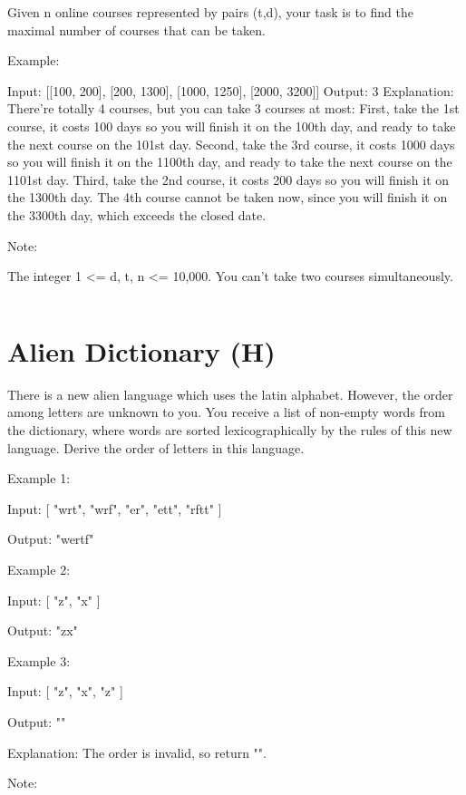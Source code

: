 Given n online courses represented by pairs (t,d), your task is to find the maximal number of courses that can be taken.

Example:

Input: [[100, 200], [200, 1300], [1000, 1250], [2000, 3200]]
Output: 3
Explanation: 
There're totally 4 courses, but you can take 3 courses at most:
First, take the 1st course, it costs 100 days so you will finish it on the 100th day, and ready to take the next course on the 101st day.
Second, take the 3rd course, it costs 1000 days so you will finish it on the 1100th day, and ready to take the next course on the 1101st day. 
Third, take the 2nd course, it costs 200 days so you will finish it on the 1300th day. 
The 4th course cannot be taken now, since you will finish it on the 3300th day, which exceeds the closed date.

 

Note:

    The integer 1 <= d, t, n <= 10,000.
    You can't take two courses simultaneously.

\begin{lstlisting}
\end{lstlisting}

\section{Alien Dictionary (H)}
There is a new alien language which uses the latin alphabet. However, the order among letters are unknown to you. You receive a list of non-empty words from the dictionary, where words are sorted lexicographically by the rules of this new language. Derive the order of letters in this language.

Example 1:

Input:
[
  "wrt",
  "wrf",
  "er",
  "ett",
  "rftt"
]

Output: "wertf"

Example 2:

Input:
[
  "z",
  "x"
]

Output: "zx"

Example 3:

Input:
[
  "z",
  "x",
  "z"
] 

Output: "" 

Explanation: The order is invalid, so return "".

Note:

